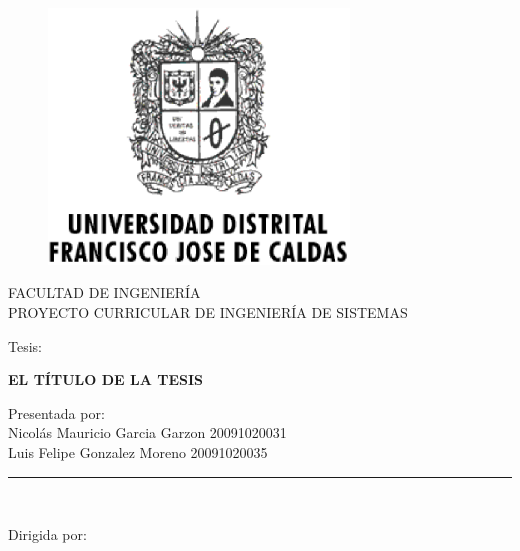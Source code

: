 \documentclass[letter,openright,12pt]{book}
\begin{document}
  \begin{titlepage}

    \begin{center}
      \vspace*{-1in}
      \begin{figure}[htb]
    \begin{center}
      \includegraphics[width=8cm]{imagenes/Logo_Distrital.eps}
    \end{center}
    \end{figure}

    FACULTAD DE INGENIERÍA\\
    \vspace*{0.15in}
    PROYECTO CURRICULAR DE INGENIERÍA DE SISTEMAS \\
    \vspace*{0.6in}
    \begin{large}
    Tesis:\\
    \end{large}
    \vspace*{0.2in}
    \begin{Large}
    \textbf{EL TÍTULO DE LA TESIS} \\
    \end{Large}
    \vspace*{0.3in}
    \begin{large}
    Presentada por:\\
      Nicolás Mauricio Garcia Garzon 20091020031 \\
      Luis Felipe Gonzalez Moreno 20091020035
    \end{large}
    \vspace*{0.3in}
    \rule{80mm}{0.1mm}\\
    \vspace*{0.1in}
    \begin{large}
    Dirigida por: \\
    \end{large}
    \end{center}

    \end{titlepage}
\end{document}

